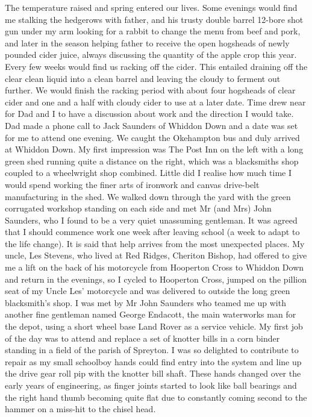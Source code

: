 The temperature raised and spring entered our lives. Some evenings would find me
stalking the hedgerows with father, and his trusty double barrel 12-bore shot
gun under my arm looking for a rabbit to change the menu from beef and pork,
and later in the season helping father to receive the open hogsheads of newly
pounded cider juice, always discussing the quantity of the apple crop this
year. Every few weeks would find us racking off the cider. This entailed
draining off the clear clean liquid into a clean barrel and leaving the cloudy
to ferment out further. We would finish the racking period with about four
hogsheads of clear cider and one and a half with cloudy cider to use at a later
date. Time drew near for Dad and I to have a discussion about work and the
direction I would take. Dad made a phone call to Jack Saunders of Whiddon Down
and a date was set for me to attend one evening. We caught the Okehampton bus
and duly arrived at Whiddon Down. My first impression was The Post Inn on the
left with a long green shed running quite a distance on the right, which was a
blacksmiths shop coupled to a wheelwright shop combined. Little did I realise
how much time I would spend working the finer arts of ironwork and canvas
drive-belt manufacturing in the shed. We walked down through the yard with the
green corrugated workshop standing on each side and met Mr (and Mrs) John
Saunders, who I found to be a very quiet unassuming gentleman. It was agreed
that I should commence work one week after leaving school (a week to adapt to
the life change). It is said that help arrives from the most unexpected places.
My uncle, Les Stevens, who lived at Red Ridges, Cheriton Bishop, had offered to
give me a lift on the back of his motorcycle from Hooperton Cross to Whiddon
Down and return in the evenings, so I cycled to Hooperton Cross, jumped on the
pillion seat of my Uncle Les' motorcycle and was delivered to outside the long
green blacksmith's shop. I was met by Mr John Saunders who teamed me up with
another fine gentleman named George Endacott, the main waterworks man for the
depot, using a short wheel base Land Rover as a service vehicle. My first job
of the day was to attend and replace a set of knotter bills in a corn binder
standing in a field of the parish of Spreyton. I was so delighted to contribute
to repair as my small schoolboy hands could find entry into the system and line
up the drive gear roll pip with the knotter bill shaft. These hands changed
over the early years of engineering, as finger joints started to look like ball
bearings and the right hand thumb becoming quite flat due to constantly coming
second to the hammer on a miss-hit to the chisel head.

